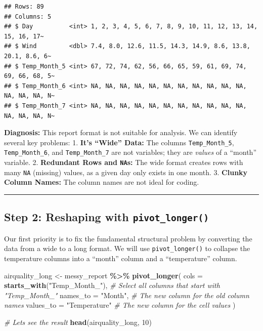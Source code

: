 \documentclass[
  11pt,
]{article}
\newenvironment{Shaded}{\begin{snugshade}}{\end{snugshade}}
\newcommand{\AttributeTok}[1]{\textcolor[rgb]{0.13,0.29,0.53}{#1}}
\newcommand{\CommentTok}[1]{\textcolor[rgb]{0.56,0.35,0.01}{\textit{#1}}}
\newcommand{\DecValTok}[1]{\textcolor[rgb]{0.00,0.00,0.81}{#1}}
\newcommand{\FunctionTok}[1]{\textcolor[rgb]{0.13,0.29,0.53}{\textbf{#1}}}
\newcommand{\NormalTok}[1]{#1}
\newcommand{\OtherTok}[1]{\textcolor[rgb]{0.56,0.35,0.01}{#1}}
\newcommand{\SpecialCharTok}[1]{\textcolor[rgb]{0.81,0.36,0.00}{\textbf{#1}}}
\newcommand{\StringTok}[1]{\textcolor[rgb]{0.31,0.60,0.02}{#1}}
\begin{document}
\begin{verbatim}
## Rows: 89
## Columns: 5
## $ Day          <int> 1, 2, 3, 4, 5, 6, 7, 8, 9, 10, 11, 12, 13, 14, 15, 16, 17~
## $ Wind         <dbl> 7.4, 8.0, 12.6, 11.5, 14.3, 14.9, 8.6, 13.8, 20.1, 8.6, 6~
## $ Temp_Month_5 <int> 67, 72, 74, 62, 56, 66, 65, 59, 61, 69, 74, 69, 66, 68, 5~
## $ Temp_Month_6 <int> NA, NA, NA, NA, NA, NA, NA, NA, NA, NA, NA, NA, NA, NA, N~
## $ Temp_Month_7 <int> NA, NA, NA, NA, NA, NA, NA, NA, NA, NA, NA, NA, NA, NA, N~
\end{verbatim}

\textbf{Diagnosis:} This report format is not suitable for analysis. We
can identify several key problems: 1. \textbf{It's ``Wide'' Data:} The
columns \texttt{Temp\_Month\_5}, \texttt{Temp\_Month\_6}, and
\texttt{Temp\_Month\_7} are not variables; they are \emph{values} of a
``month'' variable. 2. \textbf{Redundant Rows and \texttt{NA}s:} The
wide format creates rows with many \texttt{NA} (missing) values, as a
given day only exists in one month. 3. \textbf{Clunky Column Names:} The
column names are not ideal for coding.

\begin{center}\rule{0.5\linewidth}{0.5pt}\end{center}

\subsection{\texorpdfstring{Step 2: Reshaping with
\texttt{pivot\_longer()}}{Step 2: Reshaping with pivot\_longer()}}\label{step-2-reshaping-with-pivot_longer}

Our first priority is to fix the fundamental structural problem by
converting the data from a wide to a long format. We will use
\texttt{pivot\_longer()} to collapse the temperature columns into a
``month'' column and a ``temperature'' column.

\begin{Shaded}
\begin{Highlighting}[]
\NormalTok{airquality\_long }\OtherTok{\textless{}{-}}\NormalTok{ messy\_report }\SpecialCharTok{\%\textgreater{}\%}
  \FunctionTok{pivot\_longer}\NormalTok{(}
    \AttributeTok{cols =} \FunctionTok{starts\_with}\NormalTok{(}\StringTok{"Temp\_Month\_"}\NormalTok{), }\CommentTok{\# Select all columns that start with "Temp\_Month\_"}
    \AttributeTok{names\_to =} \StringTok{"Month"}\NormalTok{,               }\CommentTok{\# The new column for the old column names}
    \AttributeTok{values\_to =} \StringTok{"Temperature"}         \CommentTok{\# The new column for the cell values}
\NormalTok{  )}

\CommentTok{\# Let\textquotesingle{}s see the result}
\FunctionTok{head}\NormalTok{(airquality\_long, }\DecValTok{10}\NormalTok{)}
\end{Highlighting}
\end{Shaded}
\end{document}
